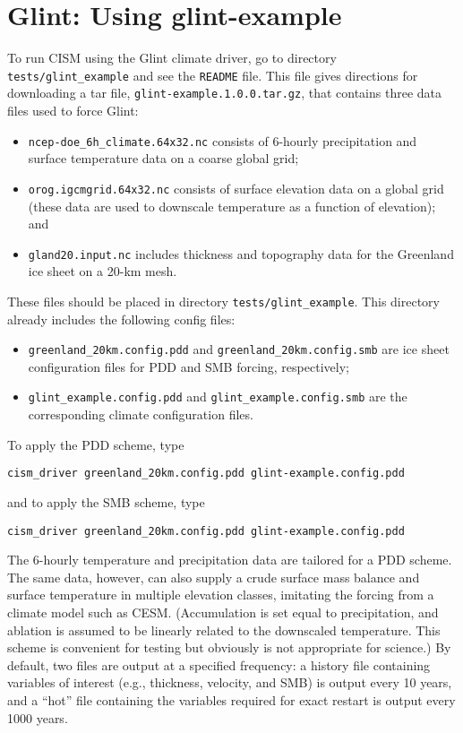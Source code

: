 \section{Glint: Using glint-example}
To run CISM using the Glint climate driver,
go to directory \texttt{tests/glint\_example} 
and see the \texttt{README} file.
This file gives directions for downloading a tar file,
\texttt{glint-example.1.0.0.tar.gz}, that contains three data files
used to force Glint:
%
\begin{itemize}
\item \texttt{ncep-doe\_6h\_climate.64x32.nc} consists of 6-hourly precipitation and
surface temperature data on a coarse global grid;
\item \texttt{orog.igcmgrid.64x32.nc} consists of surface elevation data on a global grid
(these data are used to downscale temperature as a function of elevation); and
\item \texttt{gland20.input.nc} includes thickness and topography data for the Greenland 
ice sheet on a 20-km mesh.
\end{itemize}
%
These files should be placed in directory \texttt{tests/glint\_example}. 
This directory already includes the following config files:
\begin{itemize}
\item \texttt{greenland\_20km.config.pdd} and \texttt{greenland\_20km.config.smb} are
ice sheet configuration files for PDD and SMB forcing, respectively;
\item \texttt{glint\_example.config.pdd} and \texttt{glint\_example.config.smb} are the
corresponding climate configuration files.
\end{itemize}

To apply the PDD scheme, type
\begin{verbatim}
cism_driver greenland_20km.config.pdd glint-example.config.pdd
\end{verbatim}
%
and to apply the SMB scheme, type
\begin{verbatim}
cism_driver greenland_20km.config.pdd glint-example.config.pdd
\end{verbatim}
%
The 6-hourly temperature and precipitation data 
are tailored for a PDD scheme.  The same data, however, can also supply a crude
surface mass balance and surface temperature in multiple elevation classes, imitating
the forcing from a climate model such as CESM.  (Accumulation is set equal to precipitation,
and ablation is assumed to be linearly related to the downscaled temperature.
This scheme is convenient for testing but obviously is not appropriate for science.)
By default, two files are output at a specified frequency: a history file
containing variables of interest (e.g., thickness, velocity, and SMB) is output every 10 years,
and a ``hot'' file containing the variables required for exact restart is output every 1000 years.
 
